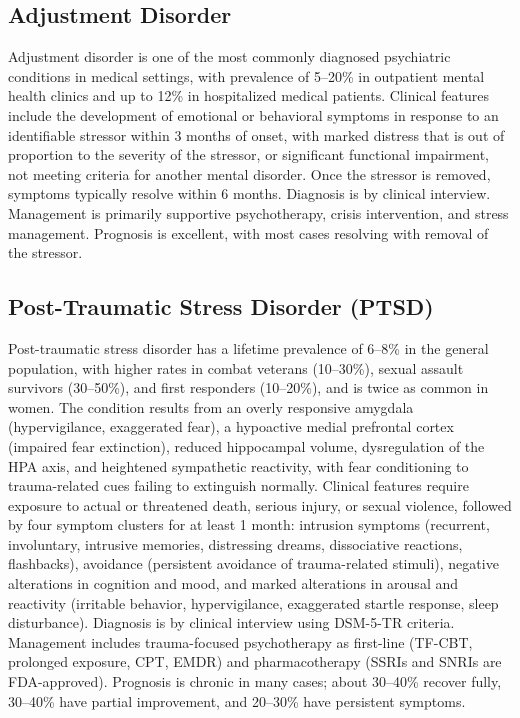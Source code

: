 \subsection{Adjustment Disorder}
\label{sec:Adjustment Disorder}
Adjustment disorder is one of the most commonly diagnosed psychiatric conditions in medical settings, with prevalence of 5--20\% in outpatient mental health clinics and up to 12\% in hospitalized medical patients. Clinical features include the development of emotional or behavioral symptoms in response to an identifiable stressor within 3 months of onset, with marked distress that is out of proportion to the severity of the stressor, or significant functional impairment, not meeting criteria for another mental disorder. Once the stressor is removed, symptoms typically resolve within 6 months. Diagnosis is by clinical interview. Management is primarily supportive psychotherapy, crisis intervention, and stress management. Prognosis is excellent, with most cases resolving with removal of the stressor.

\subsection{Post-Traumatic Stress Disorder (PTSD)}
\label{sec:Post-Traumatic Stress Disorder (PTSD)}
Post-traumatic stress disorder has a lifetime prevalence of 6--8\% in the general population, with higher rates in combat veterans (10--30\%), sexual assault survivors (30--50\%), and first responders (10--20\%), and is twice as common in women. The condition results from an overly responsive amygdala (hypervigilance, exaggerated fear), a hypoactive medial prefrontal cortex (impaired fear extinction), reduced hippocampal volume, dysregulation of the HPA axis, and heightened sympathetic reactivity, with fear conditioning to trauma-related cues failing to extinguish normally. Clinical features require exposure to actual or threatened death, serious injury, or sexual violence, followed by four symptom clusters for at least 1 month: intrusion symptoms (recurrent, involuntary, intrusive memories, distressing dreams, dissociative reactions, flashbacks), avoidance (persistent avoidance of trauma-related stimuli), negative alterations in cognition and mood, and marked alterations in arousal and reactivity (irritable behavior, hypervigilance, exaggerated startle response, sleep disturbance). Diagnosis is by clinical interview using DSM-5-TR criteria. Management includes trauma-focused psychotherapy as first-line (TF-CBT, prolonged exposure, CPT, EMDR) and pharmacotherapy (SSRIs and SNRIs are FDA-approved). Prognosis is chronic in many cases; about 30--40\% recover fully, 30--40\% have partial improvement, and 20--30\% have persistent symptoms.

